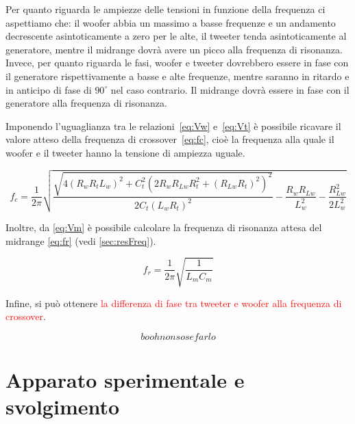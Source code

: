 \documentclass[12pt,italian]{article}
\newcommand{\err}[1]{\textcolor{red}{#1}}
\begin{document}
Per quanto riguarda le ampiezze delle tensioni in funzione della frequenza ci
aspettiamo che: il woofer abbia un massimo a basse frequenze e un andamento
decrescente asintoticamente a zero per le alte, il tweeter tenda
asintoticamente al generatore, mentre il midrange dovrà avere un picco alla
frequenza di risonanza. Invece, per quanto riguarda le fasi, woofer e tweeter
dovrebbero essere in fase con il generatore rispettivamente a basse e alte
frequenze, mentre saranno in ritardo e in anticipo di fase di $90^\circ$ nel
caso contrario. Il midrange dovrà essere in fase con il generatore alla
frequenza di risonanza.

Imponendo l'uguaglianza tra le relazioni~\eqref{eq:Vw} e~\eqref{eq:Vt} è
possibile ricavare il valore atteso della frequenza di crossover~\eqref{eq:fc},
cioè la frequenza alla quale il woofer e il tweeter hanno la tensione di
ampiezza uguale.

\begin{equation}
	f_{c} = \frac{1}{2\pi}\sqrt{\frac{\sqrt{4 (R_{w} R_{t} L_{w})^2 + C_{t}^2(2
				R_{w} R_{Lw} R_{t}^2 + (R_{Lw} R_{t})^2)^2}}{2 C _{t} (L_{w} R_{t})^2 } -
		\frac{R_{w} R_{Lw}}{L_{w}^2} - \frac{R_{Lw}^2}{2 L_{w}^2}}
	\label{eq:fc}
\end{equation}

Inoltre, da \eqref{eq:Vm} è possibile calcolare la frequenza di risonanza
attesa del midrange \eqref{eq:fr} (vedi \cref{sec:resFreq}).

\begin{equation}
	f_{r} = \frac{1}{2\pi}\sqrt{\frac{1}{L_{m} C_{m}}}  %
	\label{eq:fr}
\end{equation}

Infine, si può ottenere \err{la differenza di fase tra tweeter e woofer alla
	frequenza di crossover}.

\begin{equation}
	booh non so se farlo
\end{equation}

\section*{Apparato sperimentale e svolgimento}
\end{document}
